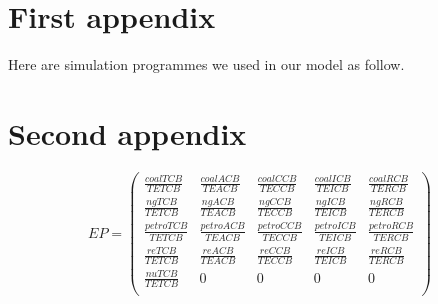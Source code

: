 \documentclass{mcmthesis}
\begin{document}
\begin{appendices}
  \section{First appendix}
  Here are simulation programmes we used in our model as follow.\\
  \section{Second appendix}
\end{appendices}
$$
  EP =
  \begin{pmatrix}
  \frac{coalTCB}{TETCB} & \frac{coalACB}{TEACB} & \frac{coalCCB}{TECCB} & \frac{coalICB}{TEICB} & \frac{coalRCB}{TERCB}  \\
  \frac{ngTCB}{TETCB} & \frac{ngACB}{TEACB} & \frac{ngCCB}{TECCB} & \frac{ngICB}{TEICB} & \frac{ngRCB}{TERCB} \\
  \frac{petroTCB}{TETCB} & \frac{petroACB}{TEACB} & \frac{petroCCB}{TECCB} & \frac{petroICB}{TEICB} & \frac{petroRCB}{TERCB} \\
  \frac{reTCB}{TETCB} & \frac{reACB}{TEACB} & \frac{reCCB}{TECCB} & \frac{reICB}{TEICB} & \frac{reRCB}{TERCB} \\
  \frac{nuTCB}{TETCB} & 0 & 0 & 0 & 0\\
  \end{pmatrix}
$$
\end{document}
